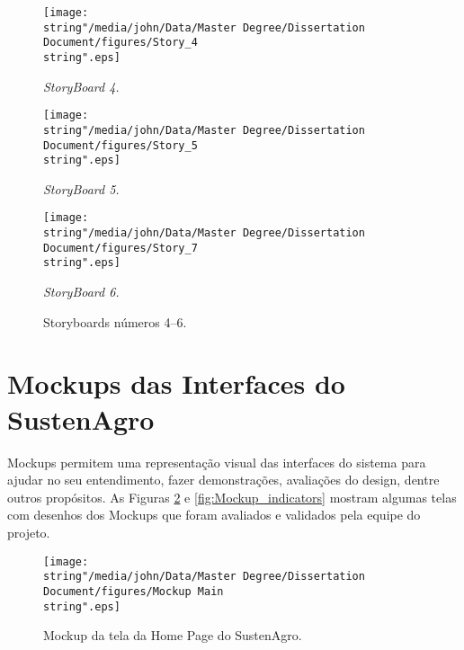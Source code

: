 \begin{figure}[H]
\begin{centering}
\texttt{[image: \\string"/media/john/Data/Master Degree/Dissertation Document/figures/Story\_4\\string".eps]}
\par\end{centering}
\begin{centering}
\textit{\small{}StoryBoard 4.}
\par\end{centering}{\small \par}
\bigskip{}

\begin{centering}
\texttt{[image: \\string"/media/john/Data/Master Degree/Dissertation Document/figures/Story\_5\\string".eps]}
\par\end{centering}
\begin{centering}
\textit{\small{}StoryBoard 5.}
\par\end{centering}{\small \par}
\bigskip{}

\begin{centering}
\texttt{[image: \\string"/media/john/Data/Master Degree/Dissertation Document/figures/Story\_7\\string".eps]}
\par\end{centering}
\begin{centering}
\textit{\small{}StoryBoard 6.}
\par\end{centering}{\small \par}
\bigskip{}

\centering{}\caption{Storyboards números 4–6.\label{fig:Storyboard-numero-4}}
\end{figure}


\section{Mockups das Interfaces do SustenAgro}

Mockups permitem uma representação visual das interfaces do sistema
para ajudar no seu entendimento, fazer demonstrações, avaliações do
design, dentre outros propósitos. As Figuras \ref{fig:Mockup_home}
e \ref{fig:Mockup_indicators} mostram algumas telas com desenhos
dos Mockups que foram avaliados e validados pela equipe do projeto.

\begin{figure}
\centering{}\texttt{[image: \\string"/media/john/Data/Master Degree/Dissertation Document/figures/Mockup Main\\string".eps]}\caption{Mockup da tela da Home Page do SustenAgro.\label{fig:Mockup_home}}
\end{figure}

